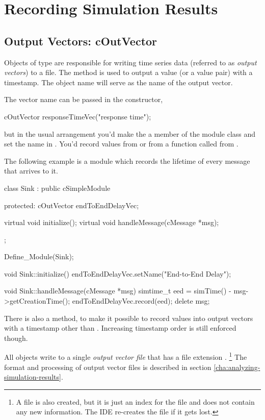 \section{Recording Simulation Results}
\label{sec:ch-sim-lib:result-recording}

\subsection{Output Vectors: cOutVector}
\label{sec:ch-sim-lib:coutvector}

Objects of type  are responsible for writing time series
data (referred to as \textit{output vectors}) to a file. The 
method is used to output a value (or a value pair) with a timestamp.
The object name will serve as the name of the output vector.

The vector name can be passed in the constructor,

\begin{cpp}
cOutVector responseTimeVec("response time");
\end{cpp}

but in the usual arrangement you'd make the  a member
of the module class and set the name in . You'd
record values from  or from a function called from
.

The following example is a  module which records the lifetime
of every message that arrives to it.

\begin{cpp}
class Sink : public cSimpleModule
{
  protected:
    cOutVector endToEndDelayVec;

    virtual void initialize();
    virtual void handleMessage(cMessage *msg);
};

Define_Module(Sink);

void Sink::initialize()
{
    endToEndDelayVec.setName("End-to-End Delay");
}

void Sink::handleMessage(cMessage *msg)
{
    simtime_t eed = simTime() - msg->getCreationTime();
    endToEndDelayVec.record(eed);
    delete msg;
}
\end{cpp}

There is also a  method, to make it
possible to record values into output vectors with a timestamp other than
. Increasing timestamp order is still enforced though.

All  objects write to a single \textit{output vector file}
that has a file extension .
  \footnote{A  file is also created, but it is just an index for
  the  file and does not contain any new information. The IDE
  re-creates the  file if it gets lost.}
The format and processing of output vector files is described in section
\ref{cha:analyzing-simulation-results}.

